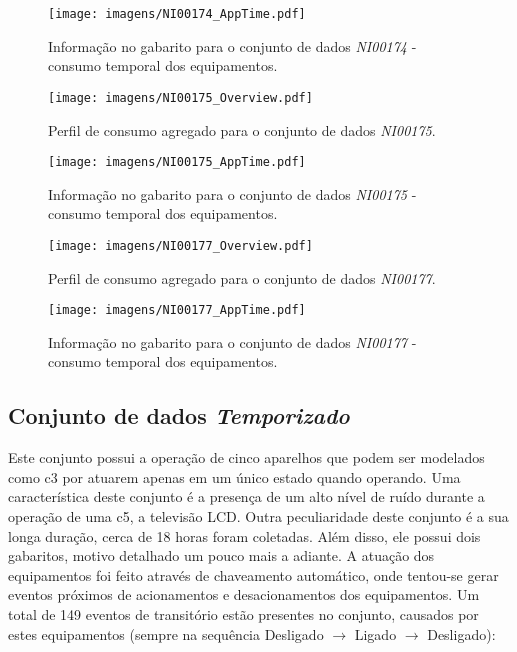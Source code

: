 \begin{sidewaysfigure}[p]
\centering
\texttt{[image: imagens/NI00174\_AppTime.pdf]}
\caption{Informação no gabarito para o conjunto de dados
\emph{NI00174} - consumo temporal dos equipamentos.}
\label{fig:ni00174_app_time}
\end{sidewaysfigure}

\begin{sidewaysfigure}[p]
\centering
\texttt{[image: imagens/NI00175\_Overview.pdf]}
\caption{Perfil de consumo agregado para o conjunto de dados
\emph{NI00175}.}
\label{fig:ni00175_overview}
\end{sidewaysfigure}

\begin{sidewaysfigure}[p]
\centering
\texttt{[image: imagens/NI00175\_AppTime.pdf]}
\caption{Informação no gabarito para o conjunto de dados
\emph{NI00175} - consumo temporal dos equipamentos.}
\label{fig:ni00175_app_time}
\end{sidewaysfigure}

\begin{sidewaysfigure}[p]
\centering
\texttt{[image: imagens/NI00177\_Overview.pdf]}
\caption{Perfil de consumo agregado para o conjunto de dados
\emph{NI00177}.}
\label{fig:ni00177_overview}
\end{sidewaysfigure}

\begin{sidewaysfigure}[p]
\centering
\texttt{[image: imagens/NI00177\_AppTime.pdf]}
\caption{Informação no gabarito para o conjunto de dados
\emph{NI00177} - consumo temporal dos equipamentos.}
\label{fig:ni00177_app_time}
\end{sidewaysfigure}

\FloatBarrier
\subsection{Conjunto de dados \emph{Temporizado}}
\label{ssec:temp}

Este conjunto possui a operação de cinco aparelhos que podem ser
modelados como \acs{c3} por atuarem apenas em um único estado quando
operando. Uma característica deste conjunto é a presença de um alto
nível de ruído durante a operação de uma \acs{c5}, a televisão LCD.
Outra peculiaridade deste conjunto é a sua longa duração, cerca de 18
horas foram coletadas. Além disso, ele possui dois gabaritos, motivo
detalhado um pouco mais a adiante. A atuação dos equipamentos foi
feito através de chaveamento automático, onde tentou-se gerar eventos
próximos de acionamentos e desacionamentos dos equipamentos. Um total
de 149 eventos de transitório estão presentes no conjunto, causados
por estes equipamentos (sempre na sequência Desligado $\rightarrow$
Ligado $\rightarrow$ Desligado):

